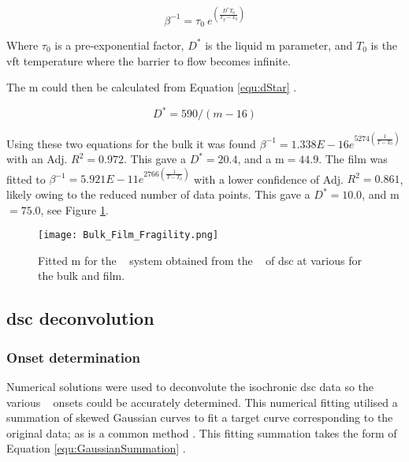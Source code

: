 \documentclass[a4paper,12pt,oneside]{article}%
\begin{document}
\begin{equation}
	\beta^{-1} = \tau_{0}~ e^{(\frac{D^{*}T_{0}}{T_{g}-T_{0}})}
	\label{equ:VFT}
\end{equation}

Where $\tau_{0}$ is a pre-exponential factor, $D^{*}$ is the liquid \acrlong{m} parameter, and $T_{0}$ is the \gls{vft} temperature where the barrier to flow becomes infinite.

The \gls{m} could then be calculated from Equation \ref{equ:dStar} \cite{Angell2002, Wei2014}.

\begin{equation}
	D^{*}=590/(m-16)
	\label{equ:dStar}
\end{equation}

Using these two equations for the bulk it was found $\beta^{-1} = 1.338E - 16e^{5274 (\frac{1}{T-T_{0}})}$ with an Adj. $R^{2}=0.972$. This gave a $D^{*}=20.4$, and a \gls{m}$=44.9$. The film was fitted to $\beta^{-1} = 5.921E - 11e^{2766 (\frac{1}{T-T_{0}})}$ with a lower confidence of Adj. $R^{2}=0.861$, likely owing to the reduced number of data points. This gave a $D^{*}=10.0$, and \gls{m}$=75.0$, see Figure \ref{fig:Fragility_BulkFilm_mValue}.

\begin{figure}[b]
	\centering
	\texttt{[image: Bulk\_Film\_Fragility.png]}
	\caption{Fitted \acrfull{m} for the \MgZnCa~ system obtained from the \Tg~ of \acrshort{dsc} at various  for the bulk and film.}
	\label{fig:Fragility_BulkFilm_mValue}
\end{figure}

\subsection{\acrshort{dsc} deconvolution}

\subsubsection{Onset determination}

Numerical 
solutions were used to deconvolute the isochronic \acrshort{dsc} data so the various \Tx~ onsets could be accurately determined. This numerical fitting utilised a summation of skewed Gaussian curves to fit a target curve corresponding to the original data; as is a common method \cite{Ashour2010, Yamamoto2007, Spink2008, Spink2015, Schaffer2005}. This fitting summation takes the form of Equation \ref{equ:GaussianSummation} .
\end{document}
